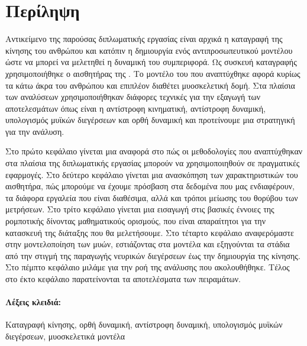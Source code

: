 \section*{Περίληψη}

Αντικείμενο της παρούσας διπλωματικής εργασίας είναι αρχικά η καταγραφή της κίνησης του ανθρώπου και κατόπιν η δημιουργία ενός αντιπροσωπευτικού μοντέλου ώστε να μπορεί να μελετηθεί η δυναμική του συμπεριφορά. Ως συσκευή καταγραφής χρησιμοποιήθηκε ο αισθητήρας  της . Το μοντέλο του που αναπτύχθηκε αφορά κυρίως τα κάτω άκρα του ανθρώπου και επιπλέον διαθέτει μυοσκελετική δομή. Στα πλαίσια των αναλύσεων χρησιμοποιήθηκαν διάφορες τεχνικές για την εξαγωγή των αποτελεσμάτων όπως είναι η αντίστροφη κινηματική, αντίστροφη δυναμική, υπολογισμός μυϊκών διεγέρσεων και ορθή δυναμική και προτείνουμε μια στρατηγική για την ανάλυση.

Στο πρώτο κεφάλαιο γίνεται μια αναφορά στο πώς οι μεθοδολογίες που αναπτύχθηκαν στα πλαίσια της διπλωματικής εργασίας μπορούν να χρησιμοποιηθούν σε πραγματικές εφαρμογές. Στο δεύτερο κεφάλαιο γίνεται μια ανασκόπηση των χαρακτηριστικών του αισθητήρα, πώς μπορούμε να έχουμε πρόσβαση στα δεδομένα που μας ενδιαφέρουν, τα διάφορα εργαλεία που είναι διαθέσιμα, αλλά και τρόποι μείωσης του θορύβου των μετρήσεων. Στο τρίτο κεφάλαιο γίνεται μια εισαγωγή στις βασικές έννοιες της ρομποτικής δίνοντας μαθηματικούς ορισμούς, που είναι απαραίτητοι για την κατασκευή της διάταξης που θα μελετήσουμε. Στο τέταρτο κεφάλαιο αναφερόμαστε στην μοντελοποίηση των μυών, εστιάζοντας στα μοντέλα  και εξηγούνται τα στάδια από την στιγμή της παραγωγής νευρικών διεγέρσεων έως την δημιουργία της κίνησης. Στο πέμπτο κεφάλαιο μιλάμε για την ροή της ανάλυσης που ακολουθήθηκε. Τέλος στο έκτο κεφάλαιο παρατείνονται τα αποτελέσματα των πειραμάτων.


\paragraph{\textbf{Λέξεις κλειδιά:}}Καταγραφή κίνησης, ορθή δυναμική, αντίστροφη δυναμική, υπολογισμός μυϊκών διεγέρσεων, μυοσκελετικά μοντέλα

\thispagestyle{empty}
\clearpage\mbox{}
\thispagestyle{empty}
\clearpage

